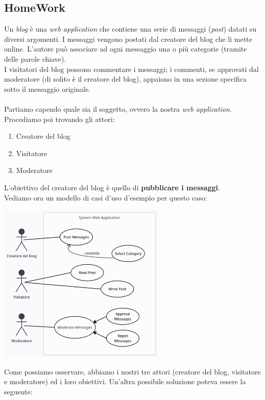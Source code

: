 \documentclass{article}
\begin{document}
\subsection*{HomeWork}
\large
Un \textit{blog} è una \textit{web application} che contiene una serie di messaggi (\textit{post}) datati su diversi argomenti. I messaggi vengono postati dal creatore del blog che li mette online. L'autore può associare ad ogni messaggio una o più categorie (tramite delle parole chiave). \\
I visitatori del blog possono commentare i messaggi; i commenti, se approvati dal moderatore (di solito è il creatore del blog), appaiono in una sezione specifica sotto il messaggio originale. \\ \\
Partiamo capendo quale sia il soggetto, ovvero la nostra \textit{web application}. Procediamo poi trovando gli attori:
\begin{enumerate}
    \renewcommand{\labelenumi}{-}
    \itemsep0em
    \item Creatore del blog
    \item Visitatore
    \item Moderatore
\end{enumerate}
L'obiettivo del creatore del blog è quello di \textbf{pubblicare i messaggi}.\\
Vediamo ora un modello di casi d'uso d'esempio per questo caso:
\begin{center}
    \includegraphics[width=0.6\textwidth]{foto 6.png}
\end{center}
Come possiamo osservare, abbiamo i nostri tre attori (creatore del blog, visitatore e moderatore) ed i loro obiettivi.
Un'altra possibile soluzione poteva essere la seguente:
\end{document}
